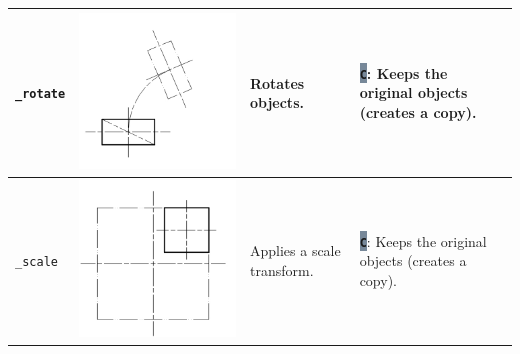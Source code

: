 \documentclass[..]{../IEEEphot}
\newcommand{\param}[1]{\colorbox{LightSlateGray}{\color{Navy}\texttt{\textbf{#1}}}}
\begin{document}
\begin{center}
\begin{longtable}{m{.2\linewidth}m{.2\linewidth}m{.25\linewidth}m{.25\linewidth}}
\texttt{\_rotate} & \includegraphics[width = 0.8\linewidth, keepaspectratio]{../images/jpg/_rotate.jpg} & Rotates objects. & 
\param{C}: Keeps the original objects (creates a copy).
\\	
\midrule
\texttt{\_scale} & \includegraphics[width = 0.8\linewidth, keepaspectratio]{../images/jpg/_scale.jpg} & Applies a scale transform. & 
\param{C}: Keeps the original objects (creates a copy).
\\	
\midrule

\end{longtable}
\end{center}
\end{document}
